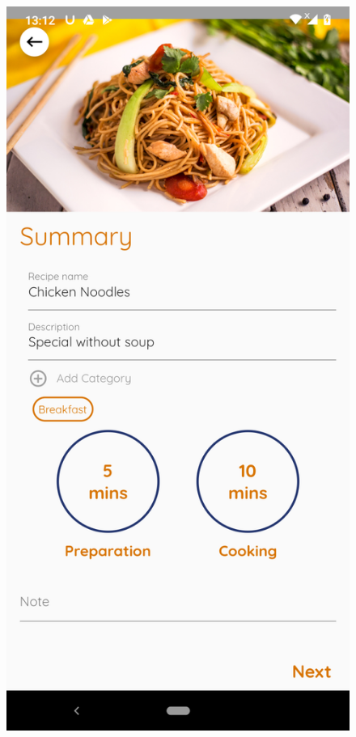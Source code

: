 \documentclass{article}
\begin{document}
    \begin{figure}[h!]
    \centering
    \includegraphics[scale=0.1]{Images/firednod_order.jpg}

\end{figure}
\end{document}
